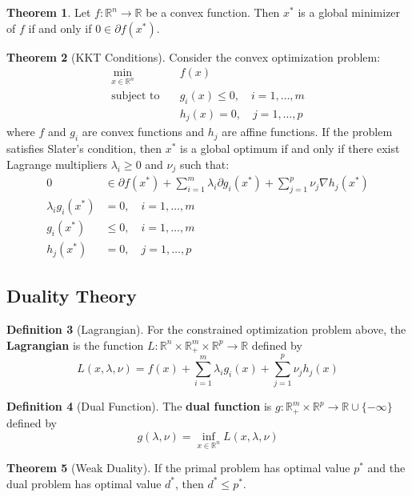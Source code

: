 \documentclass[12pt,a4paper]{article}
\theoremstyle{definition}
\newtheorem{theorem}{Theorem}[section]
\newtheorem{definition}[theorem]{Definition}
\begin{document}
\begin{theorem}
Let $f: \mathbb{R}^n \to \mathbb{R}$ be a convex function. Then $x^*$ is a global minimizer of $f$ if and only if $0 \in \partial f(x^*)$.
\end{theorem}

\begin{theorem}[KKT Conditions]
Consider the convex optimization problem:
\begin{align}
\min_{x \in \mathbb{R}^n} &\quad f(x)\\
\text{subject to} &\quad g_i(x) \leq 0, \quad i = 1, \ldots, m\\
&\quad h_j(x) = 0, \quad j = 1, \ldots, p
\end{align}
where $f$ and $g_i$ are convex functions and $h_j$ are affine functions. If the problem satisfies Slater's condition, then $x^*$ is a global optimum if and only if there exist Lagrange multipliers $\lambda_i \geq 0$ and $\nu_j$ such that:
\begin{align}
0 &\in \partial f(x^*) + \sum_{i=1}^m \lambda_i \partial g_i(x^*) + \sum_{j=1}^p \nu_j \nabla h_j(x^*)\\
\lambda_i g_i(x^*) &= 0, \quad i = 1, \ldots, m\\
g_i(x^*) &\leq 0, \quad i = 1, \ldots, m\\
h_j(x^*) &= 0, \quad j = 1, \ldots, p
\end{align}
\end{theorem}

\subsection{Duality Theory}

\begin{definition}[Lagrangian]
For the constrained optimization problem above, the \textbf{Lagrangian} is the function $L: \mathbb{R}^n \times \mathbb{R}^m_+ \times \mathbb{R}^p \to \mathbb{R}$ defined by
\[L(x, \lambda, \nu) = f(x) + \sum_{i=1}^m \lambda_i g_i(x) + \sum_{j=1}^p \nu_j h_j(x)\]
\end{definition}

\begin{definition}[Dual Function]
The \textbf{dual function} is $g: \mathbb{R}^m_+ \times \mathbb{R}^p \to \mathbb{R} \cup \{-\infty\}$ defined by
\[g(\lambda, \nu) = \inf_{x \in \mathbb{R}^n} L(x, \lambda, \nu)\]
\end{definition}

\begin{theorem}[Weak Duality]
If the primal problem has optimal value $p^*$ and the dual problem has optimal value $d^*$, then $d^* \leq p^*$.
\end{theorem}
\end{document}
